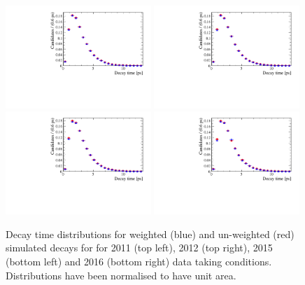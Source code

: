 \begin{figure}[htbp]
  \centering
    \includegraphics[width=0.49\textwidth]{./Figs/LifetimeMeasurement/2011_DT_Bs2MuMu.pdf}
    \includegraphics[width=0.49\textwidth]{./Figs/LifetimeMeasurement/2012_DT_Bs2MuMu.pdf}
    \includegraphics[width=0.49\textwidth]{./Figs/LifetimeMeasurement/2015_DT_Bs2MuMu.pdf}
    \includegraphics[width=0.49\textwidth]{./Figs/LifetimeMeasurement/2016_DT_Bs2MuMu.pdf}
  \caption{Decay time distributions for weighted (blue) and un-weighted (red) \bsmumu simulated decays for for 2011 (top left), 2012 (top right), 2015 (bottom left) and 2016 (bottom right) data taking conditions. Distributions have been normalised to have unit area.}
  \label{fig:BsmmDT}
\end{figure}

